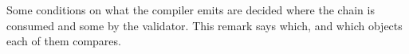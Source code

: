 
Some conditions on what the compiler emits are decided where the chain is
consumed and some by the validator. This remark says which, and which objects
each of them compares.

